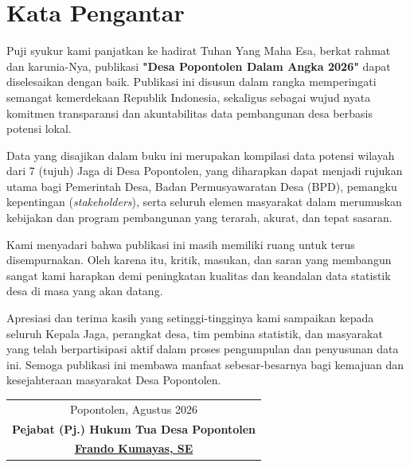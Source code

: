 
\section*{Kata Pengantar}

Puji syukur kami panjatkan ke hadirat Tuhan Yang Maha Esa, berkat rahmat dan karunia-Nya, publikasi \textbf{"Desa Popontolen Dalam Angka 2026"} dapat diselesaikan dengan baik. Publikasi ini disusun dalam rangka memperingati semangat kemerdekaan Republik Indonesia, sekaligus sebagai wujud nyata komitmen transparansi dan akuntabilitas data pembangunan desa berbasis potensi lokal.

Data yang disajikan dalam buku ini merupakan kompilasi data potensi wilayah dari 7 (tujuh) Jaga di Desa Popontolen, yang diharapkan dapat menjadi rujukan utama bagi Pemerintah Desa, Badan Permusyawaratan Desa (BPD), pemangku kepentingan (\textit{stakeholders}), serta seluruh elemen masyarakat dalam merumuskan kebijakan dan program pembangunan yang terarah, akurat, dan tepat sasaran.

Kami menyadari bahwa publikasi ini masih memiliki ruang untuk terus disempurnakan. Oleh karena itu, kritik, masukan, dan saran yang membangun sangat kami harapkan demi peningkatan kualitas dan keandalan data statistik desa di masa yang akan datang.

Apresiasi dan terima kasih yang setinggi-tingginya kami sampaikan kepada seluruh Kepala Jaga, perangkat desa, tim pembina statistik, dan masyarakat yang telah berpartisipasi aktif dalam proses pengumpulan dan penyusunan data ini. Semoga publikasi ini membawa manfaat sebesar-besarnya bagi kemajuan dan kesejahteraan masyarakat Desa Popontolen.

\vspace{1.5cm}
\begin{flushright}
  \begin{tabular}{c}
    Popontolen, Agustus 2026 \\
    \textbf{Pejabat (Pj.) Hukum Tua Desa Popontolen} \\[1.8cm]
    \textbf{\underline{Frando Kumayas, SE}}
  \end{tabular}
\end{flushright}
